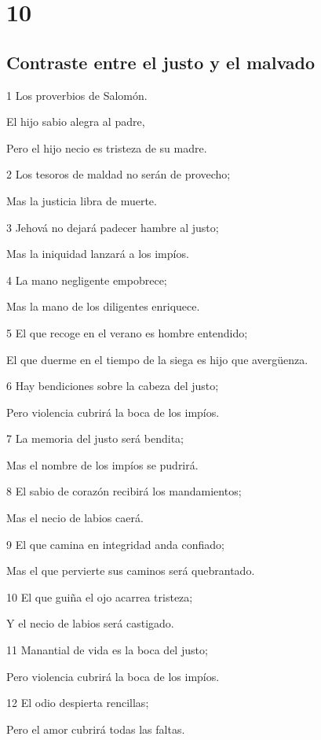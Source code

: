 \chapter{10}

\section*{Contraste entre el justo y el malvado}

\par 1 Los proverbios de Salomón.
\par El hijo sabio alegra al padre,
\par Pero el hijo necio es tristeza de su madre.
\par 2 Los tesoros de maldad no serán de provecho;
\par Mas la justicia libra de muerte.
\par 3 Jehová no dejará padecer hambre al justo;
\par Mas la iniquidad lanzará a los impíos.
\par 4 La mano negligente empobrece;
\par Mas la mano de los diligentes enriquece.
\par 5 El que recoge en el verano es hombre entendido;
\par El que duerme en el tiempo de la siega es hijo que avergüenza.
\par 6 Hay bendiciones sobre la cabeza del justo;
\par Pero violencia cubrirá la boca de los impíos.
\par 7 La memoria del justo será bendita;
\par Mas el nombre de los impíos se pudrirá.
\par 8 El sabio de corazón recibirá los mandamientos;
\par Mas el necio de labios caerá.
\par 9 El que camina en integridad anda confiado;
\par Mas el que pervierte sus caminos será quebrantado.
\par 10 El que guiña el ojo acarrea tristeza;
\par Y el necio de labios será castigado.
\par 11 Manantial de vida es la boca del justo;
\par Pero violencia cubrirá la boca de los impíos.
\par 12 El odio despierta rencillas;
\par Pero el amor cubrirá todas las faltas. 
